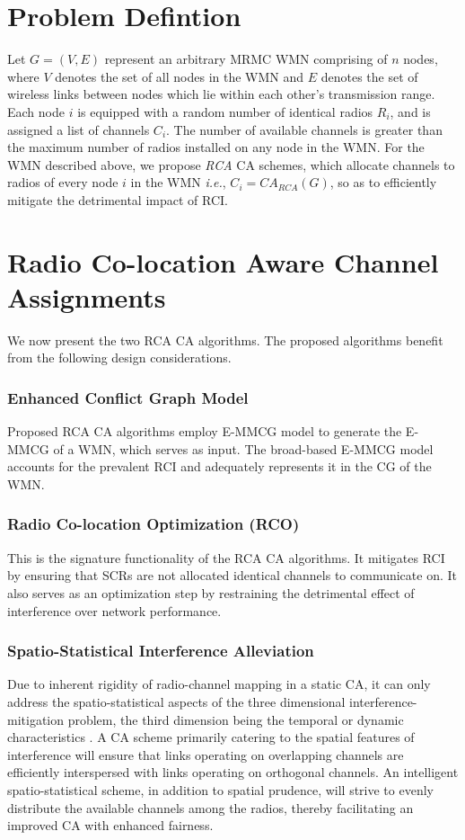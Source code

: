 \documentclass[conference]{IEEEtran}
\begin{document}
\section{Problem Defintion}
Let $G=(V,E)$ represent an arbitrary MRMC WMN comprising of $n$ nodes, where $V$ denotes the set of all nodes in the WMN and $E$ denotes the set of wireless links between nodes which lie within each other's transmission range. Each node $i$ is equipped with a random number of identical radios $R_i$, and is assigned a list of channels $C_i$. The number of available channels is greater than the maximum number of radios installed on any node in the WMN. For the WMN described above, we propose \textit{RCA} CA schemes, which allocate channels to radios of every node $i$ in the WMN \emph{i.e.}, $C_i = CA_{RCA}(G)$, so as to efficiently mitigate the detrimental impact of RCI. 


\section{Radio Co-location Aware Channel Assignments}
We now present the two RCA CA algorithms. The proposed algorithms benefit from the following design considerations.
\subsubsection{Enhanced Conflict Graph Model}
Proposed RCA CA algorithms employ E-MMCG model \cite{Manas} to generate the E-MMCG of a WMN, which serves as input. The broad-based E-MMCG model accounts for the prevalent RCI and adequately represents it in the CG of the WMN.
\subsubsection{Radio Co-location Optimization (RCO)}
This is the signature functionality of the RCA CA algorithms. It mitigates RCI by ensuring that SCRs are not allocated identical channels to communicate on. It also serves as an optimization step by restraining the detrimental effect of interference over network performance.
\subsubsection{Spatio-Statistical Interference Alleviation}
 Due to inherent rigidity of radio-channel mapping in a static CA, it can only address the spatio-statistical aspects of the three dimensional interference-mitigation problem, the third dimension being the temporal or dynamic characteristics \cite{Manas3}. A CA scheme primarily catering to the spatial features of interference will ensure that links operating on overlapping channels are efficiently interspersed with links operating on orthogonal channels. An intelligent spatio-statistical scheme, in addition to spatial prudence, will strive to evenly distribute the available channels among the radios, thereby facilitating an improved CA with enhanced fairness.
\end{document}
